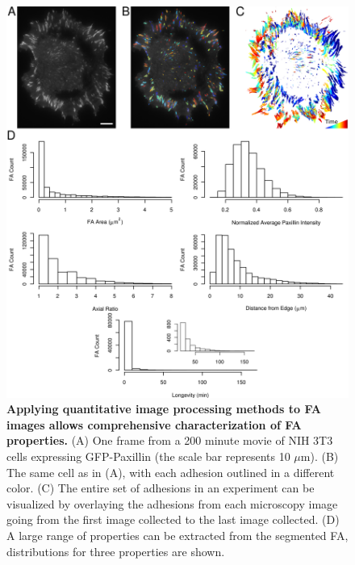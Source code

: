 \begin{figure}[htbp]
\begin{center}
\includegraphics[width=\textwidth]{../figures/statics/statics}
\end{center}
\caption{
{\bf Applying quantitative image processing methods to FA images allows comprehensive characterization of FA properties.} (A) One frame from a 200 minute movie of NIH 3T3 cells expressing GFP-Paxillin (the scale bar represents 10 $\mu$m). (B) The same cell as in (A), with each adhesion outlined in a different color. (C) The entire set of adhesions in an experiment can be visualized by overlaying the adhesions from each microscopy image going from the first image collected to the last image collected. (D) A large range of properties can be extracted from the segmented FA, distributions for three properties are shown.
}
\label{statics}
\end{figure}


